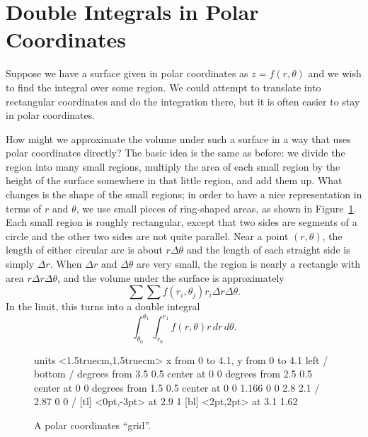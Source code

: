 \section{Double Integrals in Polar Coordinates}\label{sec:DoubleIntegralsinPolarCoordinates}

Suppose we have a surface given in polar coordinates as
$z=f(r,\theta)$ and we wish to find the integral over some region. We
could attempt to translate into rectangular coordinates and do the
integration there, but it is often easier to stay in polar
coordinates.

How might we approximate the volume under such a surface in a way that
uses polar coordinates directly? The basic idea is the same as
before: we divide the region into many small regions, multiply the
area of each small region by the height of the surface somewhere in
that little region, and add them up. What changes is the shape of the
small regions; in order to have a nice representation in terms of $r$
and $\theta$, we use small pieces of ring-shaped areas, as shown in
Figure~\ref{fig:polarcoordinatesregions}. Each small region
is roughly rectangular, except that two sides are segments of a circle
and the other two sides are not quite parallel. Near a point
$(r,\theta)$, the length of either circular arc is about
$r\Delta\theta$ and the length of each straight side is simply $\Delta
r$. When $\Delta r$ and $\Delta \theta$ are very small, the region is
nearly a rectangle with area $r\Delta r\Delta\theta$, and the volume
under the surface is approximately
\[\sum\sum f(r_i,\theta_j)r_i\Delta r\Delta\theta.\]
In the limit, this turns into a double integral
\[\int_{\theta_0}^{\theta_1}\int_{r_0}^{r_1} f(r,\theta)r\,dr\,d\theta.\]

\begin{figure}[H]
\centerline{
\vbox{\beginpicture
\normalgraphs
\setcoordinatesystem units <1.5truecm,1.5truecm>
\setplotarea x from 0 to 4.1, y from 0 to 4.1
\axis left  /
\axis bottom  /
 degrees from 3.5 0.5 center at 0 0
 degrees from 2.5 0.5 center at 0 0
 degrees from 1.5 0.5 center at 0 0
\setlinear
{} 1.166 0 0 2.8 2.1 /
 2.87 0 0 /
 [tl] <0pt,-3pt> at 2.9 1
 [bl] <2pt,2pt> at 3.1 1.62
\endpicture}}
\caption{A polar coordinates ``grid''.}
\label{fig:polarcoordinatesregions}
\end{figure}

